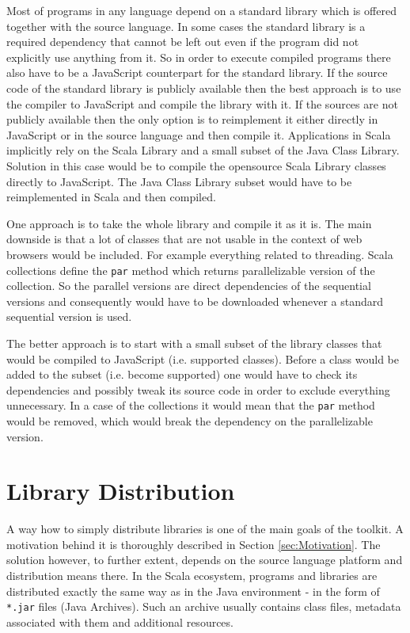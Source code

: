 \documentclass[12pt,a4paper]{report}
\begin{document}
Most of programs in any language depend on a standard library which is offered together with the source language. In some cases the standard library is a required dependency that cannot be left out even if the program did not explicitly use anything from it. So in order to execute compiled programs there also have to be a JavaScript counterpart for the standard library. If the source code of the standard library is publicly available then the best approach is to use the compiler to JavaScript and compile the library with it. If the sources are not publicly available then the only option is to reimplement it either directly in JavaScript or in the source language and then compile it. Applications in Scala implicitly rely on the Scala Library \cite{ScalaLibrary} and a small subset of the Java Class Library. Solution in this case would be to compile the opensource Scala Library classes directly to JavaScript. The Java Class Library subset would have to be reimplemented in Scala and then compiled.

One approach is to take the whole library and compile it as it is. The main downside is that a lot of classes that are not usable in the context of web browsers would be included. For example everything related to threading. Scala collections define the \texttt{par} method which returns parallelizable version of the collection. So the parallel versions are direct dependencies of the sequential versions and consequently would have to be downloaded whenever a standard sequential version is used.

The better approach is to start with a small subset of the library classes that would be compiled to JavaScript (i.e. supported classes). Before a class would be added to the subset (i.e. become supported) one would have to check its dependencies and possibly tweak its source code in order to exclude everything unnecessary. In a case of the collections it would mean that the \texttt{par} method would be removed, which would break the dependency on the parallelizable version.
 
\section{Library Distribution}

A way how to simply distribute libraries is one of the main goals of the toolkit. A motivation behind it is thoroughly described in Section \ref{sec:Motivation}. The solution however, to further extent, depends on the source language platform and distribution means there. In the Scala ecosystem, programs and libraries are distributed exactly the same way as in the Java environment - in the form of \texttt{*.jar} files (Java Archives). Such an archive usually contains class files, metadata associated with them and additional resources.
\end{document}

